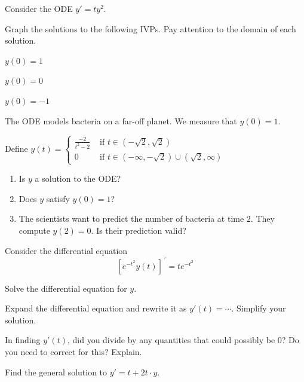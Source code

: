 \documentclass{workbook}
\begin{document}
\begin{slide}
	\question
	Consider the ODE $y'=ty^2$.

	Graph the solutions to the following IVPs. Pay attention to
	the domain of each solution.

	\begin{parts}  
		\item $y(0)=1$
		\item $y(0)=0$
		\item $y(0)=-1$
		\item The ODE models bacteria on a far-off planet. We
		measure that $y(0)=1$.

		Define $y(t)=\begin{cases}
			\frac{-2}{t^2-2}&\text{ if } t\in (-\sqrt{2},\sqrt{2})\\
			0&\text{ if }t\in (-\infty,-\sqrt{2})\cup (\sqrt{2},\infty)
		\end{cases}$
		\begin{enumerate}
			\item Is $y$ a solution to the ODE?
			\item Does $y$ satisfy $y(0)=1$?
			\item The scientists want to predict the number of bacteria at time $2$. They compute $y(2)=0$. Is their prediction valid?
		\end{enumerate}
		
		
	\end{parts}
\end{slide}

\begin{slide}
	\question
	Consider the differential equation 
	\[
	\left[e^{-t^2}y(t)\right]^{\,\prime} = te^{-t^2}
	\]

	\begin{parts}  
		\item Solve the differential equation for $y$.
		\item Expand the differential equation and rewrite 
		it as $y'(t)=\cdots$. Simplify your solution.
		\item In finding $y'(t)$, did you divide by any quantities that could possibly be $0$? Do you need to correct for this? Explain.
		\item Find the general solution to $y'=t+2t\cdot y$.	
	\end{parts}
\end{slide}
\end{document}

